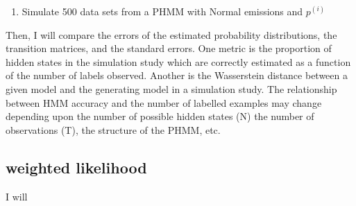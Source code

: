 \begin{enumerate}
    \item Simulate 500 data sets from a PHMM with Normal emissions and $p^{(i)}$
\end{enumerate}

Then, I will compare the errors of the estimated probability distributions, the transition matrices, and the standard errors. One metric is the proportion of hidden states in the simulation study which are correctly estimated as a function of the number of labels observed. Another is the Wasserstein distance between a given model and the generating model in a simulation study. The relationship between HMM accuracy and the number of labelled examples may change depending upon the number of possible hidden states (N) the number of observations (T), the structure of the PHMM, etc.

\subsection{weighted likelihood}

I will 

\fi